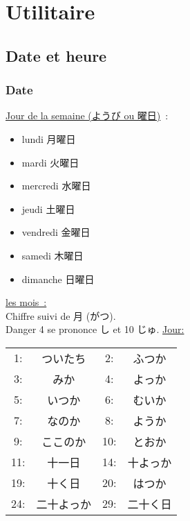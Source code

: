 \documentclass{article}
\begin{document}
\tableofcontents

\section{Utilitaire}
    \subsection{Date et heure}
\begin{CJK}{UTF8}{min}
    \subsubsection{Date}
    \underline{Jour de la semaine (ようび ou 曜日)}~:\\
    \begin{itemize}
        \item lundi 月曜日
        \item mardi 火曜日
        \item mercredi 水曜日
        \item jeudi 土曜日
        \item vendredi 金曜日
        \item samedi 木曜日
        \item dimanche 日曜日
    \end{itemize}
    \underline{les mois~:}\\
    Chiffre suivi de 月 (がつ). \\
    Danger 4 se prononce し et 10 じゅ.
    \underline{Jour:}\\
\begin{center}
  \begin{tabular}{ | c | c | c | c |}
    \hline
         1:    &ついたち &
         2:    &ふつか\\ 
         3:    &みか  &
         4:    &よっか\\
         5:    &いつか&
         6:    &むいか\\
         7:    &なのか&
         8:    &ようか\\
         9:    &ここのか &
         10:   &とおか\\
         11:   &十一日 &
         14:   &十よっか \\
         19:   &十く日 &
         20:   &はつか\\
         24:   &二十よっか& 
         29:   &二十く日\\

    \hline
  \end{tabular}
\end{center}
\end{CJK}
\end{document}
